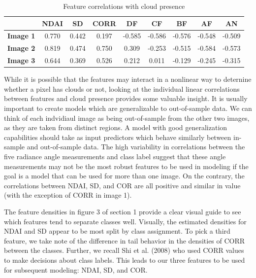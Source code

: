 \documentclass{article}\usepackage[]{graphicx}\usepackage[]{color}
\begin{document}
\begin{table}[h!]
\centering
\caption{Feature correlations with cloud presence}
\label{my-label}
\begin{tabular}{c|c|c|c|c|c|c|c|c|}
\cline{2-9}
                                       & \textbf{NDAI} & \textbf{SD} & \textbf{CORR} & \textbf{DF} & \textbf{CF} & \textbf{BF} & \textbf{AF} & \textbf{AN} \\ \hline
\multicolumn{1}{|c|}{\textbf{Image 1}} & 0.770         & 0.442       & 0.197         & -0.585      & -0.586      & -0.576      & -0.548      & -0.509      \\ \hline
\multicolumn{1}{|c|}{\textbf{Image 2}} & 0.819         & 0.474       & 0.750         & 0.309       & -0.253      & -0.515      & -0.584      & -0.573      \\ \hline
\multicolumn{1}{|c|}{\textbf{Image 3}} & 0.644         & 0.369       & 0.526         & 0.212       & 0.011       & -0.129      & -0.245      & -0.315      \\ \hline
\end{tabular}
\end{table}


While it is possible that the features may interact in a nonlinear
way to deternine whether a pixel has clouds or not, looking at the individual
linear correlations between features and cloud presence provides some valuable
insight. It is usually important to create models which 
are generalizable to out-of-sample data. We can think of each indvidiaul image as being out-of-sample
from the other two images, as they are taken from distinct regions. A model with good
generalization capabilities should take as input predictors which behave similarly
between in-sample and out-of-sample data. 
The high variability in correlations between the five radiance angle measurements
and class label suggest that these angle measurements may not be the most robust
features to be used in modeling if the goal is a model that can be used for more
than one image. On the contrary, the correlations between NDAI, SD, and COR are all
positive and similar in value (with the exception of CORR in image 1).

The feature densities in figure 3 of section 1 provide a clear visual guide to see which
features tend to separate classes well. Visually, the estimated densities for
NDAI and SD appear to be most split by class assignment. To pick a third feature,
we take note of the difference in tail behavior in the densities of CORR between
the classes. Further, we recall Shi et al. (2008) who used CORR values to make
decisions about class labels. This leads to our three features to be used for 
subsequent modeling: NDAI, SD, and COR. 
\end{document}
